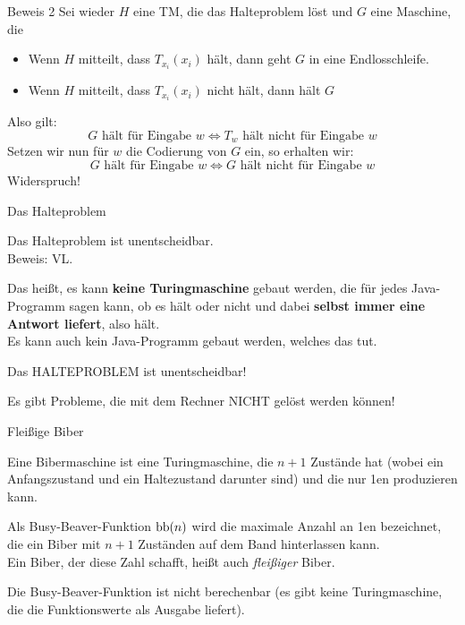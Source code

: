 {	\begin{frame}{Beweis 2}
		Sei wieder $H$ eine TM, die das Halteproblem löst und $G$ eine Maschine, die \begin{itemize}
			\item Wenn $H$ mitteilt, dass $T_{x_i} ( x_i )$ hält, dann geht $G$ in eine Endlosschleife.
			\item Wenn $H$ mitteilt, dass $T_{x_i} ( x_i )$ nicht hält, dann hält $G$
		\end{itemize}
		Also gilt: $$ G \text{ hält für Eingabe } w \iff T_w \text{ hält nicht für Eingabe } w $$
		Setzen wir nun für $w$ die Codierung von $G$ ein, so erhalten wir:
		$$ G \text{ hält für Eingabe } w \iff G \text{ hält nicht für Eingabe } w $$
		Widerspruch!
	\end{frame}
}

\begin{frame}{Das Halteproblem}
	\begin{Satz}
		Das Halteproblem ist unentscheidbar. \\
		Beweis: VL.
	\end{Satz}
	Das heißt, es kann \textbf{keine Turingmaschine} gebaut werden, die für jedes Java-Programm sagen kann, ob es hält oder nicht und dabei \textbf{selbst immer eine Antwort liefert}, also hält. \\ \pause
	\medskip \pause
	Es kann auch kein Java-Programm gebaut werden, welches das tut.
\end{frame}

\begin{headframe}
	\alert{\Huge Das HALTEPROBLEM ist unentscheidbar!}
\end{headframe}

\begin{headframe}
	\alert{\Huge Es gibt Probleme, die mit dem Rechner NICHT gelöst werden können!}
\end{headframe}

\begin{frame}{Fleißige Biber}
	\begin{Definition}
		Eine Bibermaschine ist eine Turingmaschine, die $n+1$ Zustände hat (wobei ein Anfangszustand und ein Haltezustand darunter sind) und die nur \word 1en produzieren kann.
	\end{Definition}
	\pause
	
	\begin{Definition}
		Als Busy-Beaver-Funktion ${\text{bb}}(n)$ wird die maximale Anzahl an \word 1en bezeichnet, die ein Biber mit $n+1$ Zuständen auf dem Band hinterlassen kann. \\
		Ein Biber, der diese Zahl schafft, heißt auch \emph{fleißiger} Biber.
	\end{Definition} 
	
	\begin{Satz}
		Die Busy-Beaver-Funktion ist nicht berechenbar (es gibt keine Turingmaschine, die die Funktionswerte als Ausgabe liefert).
	\end{Satz}
\end{frame}

